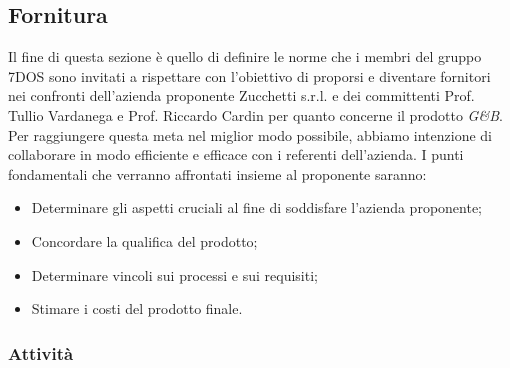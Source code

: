 \subsection{Fornitura}
Il fine di questa sezione è quello di definire le norme che i membri del gruppo 7DOS sono invitati a rispettare con l'obiettivo di proporsi e diventare fornitori nei confronti dell'azienda proponente Zucchetti s.r.l. e dei committenti Prof. Tullio Vardanega e Prof. Riccardo Cardin per quanto concerne il prodotto \emph{G\&B}.
Per raggiungere questa meta nel miglior modo possibile, abbiamo intenzione di collaborare in modo efficiente e efficace con i referenti dell'azienda. 
I punti fondamentali che verranno affrontati insieme al proponente saranno:
\begin{itemize}
\item Determinare gli aspetti cruciali al fine di soddisfare l'azienda proponente;
\item Concordare la qualifica del prodotto;
\item Determinare vincoli sui processi e sui requisiti;
\item Stimare i costi del prodotto finale.
\end{itemize}
\subsubsection{Attività}
